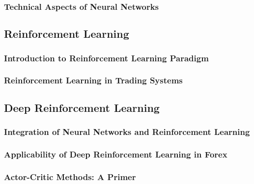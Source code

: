 \subsubsection{Technical Aspects of Neural Networks}

\subsection{Reinforcement Learning}

\subsubsection{Introduction to Reinforcement Learning Paradigm}

\subsubsection{Reinforcement Learning in Trading Systems}

\subsection{Deep Reinforcement Learning}

\subsubsection{Integration of Neural Networks and Reinforcement Learning}

\subsubsection{Applicability of Deep Reinforcement Learning in Forex}

\subsubsection{Actor-Critic Methods: A Primer}

